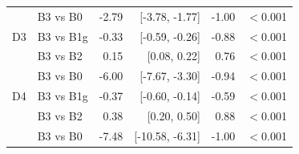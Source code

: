 \begin{tabular}{llrrrr}
 & B3 vs B0 & -2.79 & [-3.78, -1.77] & -1.00 & $<$0.001 \\
D3 & B3 vs B1g & -0.33 & [-0.59, -0.26] & -0.88 & $<$0.001 \\
 & B3 vs B2 & 0.15 & [0.08, 0.22] & 0.76 & $<$0.001 \\
 & B3 vs B0 & -6.00 & [-7.67, -3.30] & -0.94 & $<$0.001 \\
D4 & B3 vs B1g & -0.37 & [-0.60, -0.14] & -0.59 & $<$0.001 \\
 & B3 vs B2 & 0.38 & [0.20, 0.50] & 0.88 & $<$0.001 \\
 & B3 vs B0 & -7.48 & [-10.58, -6.31] & -1.00 & $<$0.001 \\
\bottomrule
\end{tabular}